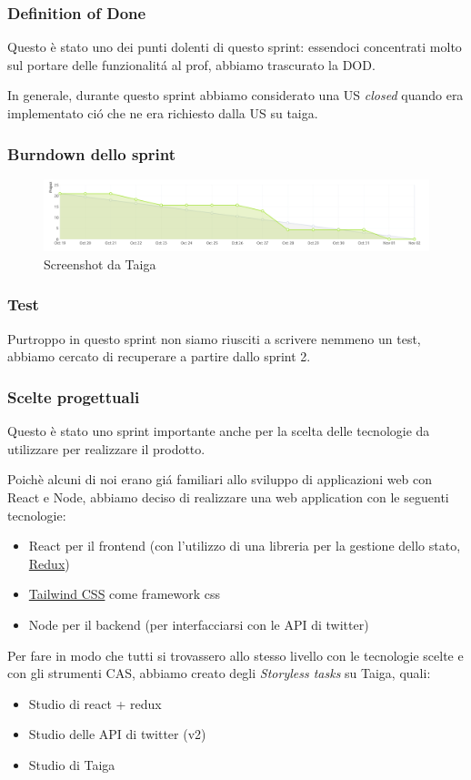 \documentclass{article}
\begin{document}
\subsubsection{Definition of Done}
Questo \`e stato uno dei punti dolenti di questo sprint: essendoci concentrati molto sul portare delle funzionalit\'a al prof, abbiamo trascurato la DOD. 

In generale, durante questo sprint abbiamo considerato una US \textit{closed} quando era implementato ci\'o che ne era richiesto dalla US su taiga.
\subsubsection{Burndown dello sprint}
\begin{figure}[H]
    \centering
    \includegraphics[scale=0.22]{burdowns/sprint1.png}
    \caption{Screenshot da Taiga}
    \label{fig:burndown1}
\end{figure}
\subsubsection{Test}
Purtroppo in questo sprint non siamo riusciti a scrivere nemmeno un test, abbiamo cercato di recuperare a partire dallo sprint 2.
\subsubsection{Scelte progettuali}
Questo \`e stato uno sprint importante anche per la scelta delle tecnologie da utilizzare per realizzare il prodotto. 

Poich\`e alcuni di noi erano gi\'a familiari allo sviluppo di applicazioni web con React e Node, abbiamo deciso di realizzare una web application con le seguenti tecnologie:
\begin{itemize}
    \item React per il frontend (con l'utilizzo di una libreria per la gestione dello stato, \href{https://redux.js.org/}{Redux})
    \item \href{https://tailwindcss.com/}{Tailwind CSS} come framework css
    \item Node per il backend (per interfacciarsi con le API di twitter)
\end{itemize}
Per fare in modo che tutti si trovassero allo stesso livello con le tecnologie scelte e con gli strumenti CAS, abbiamo creato degli \textit{Storyless tasks} su Taiga, quali:
\begin{itemize}
    \item Studio di react + redux
    \item Studio delle API di twitter (v2)
    \item Studio di Taiga
\end{itemize}
\end{document}

